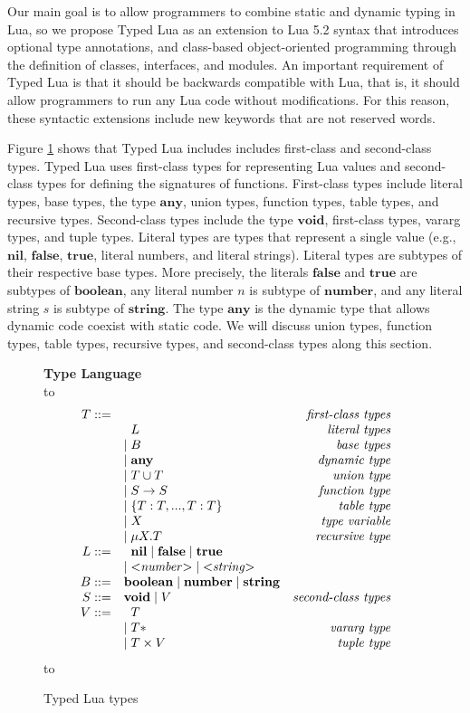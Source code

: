 \documentclass[preprint]{sig-alternate}
\newcommand{\Any}{\mathbf{any}}
\newcommand{\Nil}{\mathbf{nil}}
\newcommand{\False}{\mathbf{false}}
\newcommand{\True}{\mathbf{true}}
\newcommand{\Boolean}{\mathbf{boolean}}
\newcommand{\Number}{\mathbf{number}}
\newcommand{\String}{\mathbf{string}}
\newcommand{\Void}{\mathbf{void}}
\def\dstart{\hbox to \hsize{\vrule depth 4pt\hrulefill\vrule depth 4pt}}
\def\dend{\hbox to \hsize{\vrule height 4pt\hrulefill\vrule height 4pt}}
\begin{document}
Our main goal is to allow programmers to combine static and dynamic
typing in Lua, so we propose Typed Lua as an extension to Lua 5.2
syntax that introduces optional type annotations, and class-based
object-oriented programming through the definition of classes,
interfaces, and modules.
An important requirement of Typed Lua is that it should be backwards
compatible with Lua, that is, it should allow programmers to run any
Lua code without modifications.
For this reason, these syntactic extensions include new keywords
that are not reserved words.

Figure \ref{fig:typelang} shows that Typed Lua includes includes
first-class and second-class types.
Typed Lua uses first-class types for representing Lua values and
second-class types for defining the signatures of functions.
First-class types include literal types, base types, the type $\Any$,
union types, function types, table types, and recursive types.
Second-class types include the type $\Void$, first-class types,
vararg types, and tuple types.
Literal types are types that represent a single value
(e.g., $\Nil$, $\False$, $\True$, literal numbers, and
literal strings).
Literal types are subtypes of their respective base types.
More precisely, the literals $\False$ and $\True$ are subtypes of
$\Boolean$, any literal number $n$ is subtype of $\Number$, and any
literal string $s$ is subtype of $\String$.
The type $\Any$ is the dynamic type that allows dynamic code coexist
with static code.
We will discuss union types, function types, table types, recursive
types, and second-class types along this section.

\begin{figure}[!ht]
\textbf{Type Language}\\
\dstart
$$
\begin{array}{rlr}
T ::= & & \textit{first-class types}\\
& \;\; L & \textit{literal types}\\
& | \; B & \textit{base types}\\
& | \; \Any & \textit{dynamic type}\\
& | \; T \cup T & \textit{union type}\\
& | \; S \rightarrow S & \textit{function type}\\
& | \; \{T:T, ..., T:T\} & \textit{table type}\\
& | \; X & \textit{type variable}\\
& | \; \mu X.T & \textit{recursive type}\\
L ::= & \;\; \Nil \; | \; \False \; | \; \True & \\
& | \; {<}{\it numbe}r{>} \; | \; {<}{\it string}{>} & \\
B ::= & \Boolean \; | \; \Number \; | \; \String & \\
S ::= & \Void \; | \; V & \textit{second-class types}\\
V ::= & \;\; T & \\
& | \; T* & \textit{vararg type}\\
& | \; T \times V & \textit{tuple type}
\end{array}
$$
\dend
\caption{Typed Lua types}
\label{fig:typelang}
\end{figure}
\end{document}

